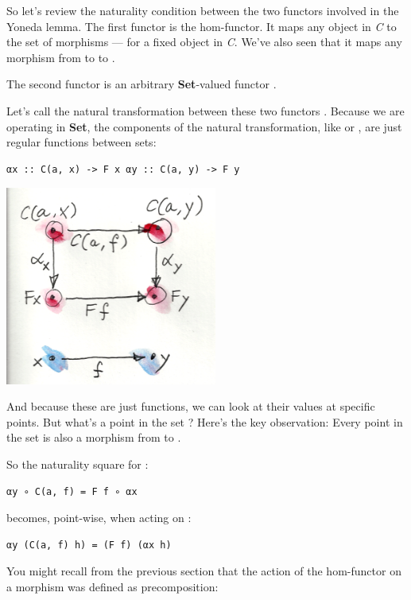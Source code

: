 So let's review the naturality condition between the two functors
involved in the Yoneda lemma. The first functor is the hom-functor. It
maps any object  in \emph{C} to the set of morphisms
 --- for  a fixed object in \emph{C}. We've
also seen that it maps any morphism  from  to
 to .

The second functor is an arbitrary \textbf{Set}-valued functor
.

Let's call the natural transformation between these two functors
. Because we are operating in \textbf{Set}, the components of
the natural transformation, like  or , are just
regular functions between sets:

\begin{verbatim}
αx :: C(a, x) -> F x αy :: C(a, y) -> F y
\end{verbatim}

\includegraphics[width=2.73958in]{images/yoneda1.png}

And because these are just functions, we can look at their values at
specific points. But what's a point in the set ? Here's
the key observation: Every point in the set  is also a
morphism  from  to .

So the naturality square for :

\begin{verbatim}
αy ∘ C(a, f) = F f ∘ αx
\end{verbatim}

becomes, point-wise, when acting on :

\begin{verbatim}
αy (C(a, f) h) = (F f) (αx h)
\end{verbatim}

You might recall from the previous section that the action of the
hom-functor  on a morphism  was defined as
precomposition:

